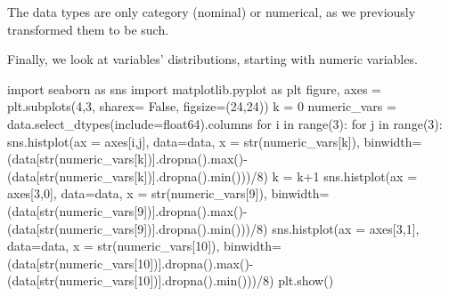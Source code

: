 \documentclass[
  11pt,
  letterpaper,
  DIV=11,
  numbers=noendperiod]{scrartcl}
\newenvironment{Shaded}{\begin{snugshade}}{\end{snugshade}}
\newcommand{\BuiltInTok}[1]{\textcolor[rgb]{0.00,0.23,0.31}{#1}}
\newcommand{\ControlFlowTok}[1]{\textcolor[rgb]{0.00,0.23,0.31}{#1}}
\newcommand{\DecValTok}[1]{\textcolor[rgb]{0.68,0.00,0.00}{#1}}
\newcommand{\ImportTok}[1]{\textcolor[rgb]{0.00,0.46,0.62}{#1}}
\newcommand{\KeywordTok}[1]{\textcolor[rgb]{0.00,0.23,0.31}{#1}}
\newcommand{\NormalTok}[1]{\textcolor[rgb]{0.00,0.23,0.31}{#1}}
\newcommand{\OperatorTok}[1]{\textcolor[rgb]{0.37,0.37,0.37}{#1}}
\newcommand{\StringTok}[1]{\textcolor[rgb]{0.13,0.47,0.30}{#1}}
\newcommand{\VariableTok}[1]{\textcolor[rgb]{0.07,0.07,0.07}{#1}}
\begin{document}
The data types are only category (nominal) or numerical, as we
previously transformed them to be such.

Finally, we look at variables' distributions, starting with numeric
variables.

\begin{Shaded}
\begin{Highlighting}[]
\ImportTok{import}\NormalTok{ seaborn }\ImportTok{as}\NormalTok{ sns}
\ImportTok{import}\NormalTok{ matplotlib.pyplot }\ImportTok{as}\NormalTok{ plt}
\NormalTok{figure, axes }\OperatorTok{=}\NormalTok{ plt.subplots(}\DecValTok{4}\NormalTok{,}\DecValTok{3}\NormalTok{, sharex}\OperatorTok{=} \VariableTok{False}\NormalTok{, figsize}\OperatorTok{=}\NormalTok{(}\DecValTok{24}\NormalTok{,}\DecValTok{24}\NormalTok{))}
\NormalTok{k }\OperatorTok{=} \DecValTok{0}
\NormalTok{numeric\_vars }\OperatorTok{=}\NormalTok{  data.select\_dtypes(include}\OperatorTok{=}\StringTok{\textquotesingle{}float64\textquotesingle{}}\NormalTok{).columns}
\ControlFlowTok{for}\NormalTok{ i }\KeywordTok{in} \BuiltInTok{range}\NormalTok{(}\DecValTok{3}\NormalTok{):}
    \ControlFlowTok{for}\NormalTok{ j }\KeywordTok{in} \BuiltInTok{range}\NormalTok{(}\DecValTok{3}\NormalTok{):}
\NormalTok{        sns.histplot(ax }\OperatorTok{=}\NormalTok{ axes[i,j], data}\OperatorTok{=}\NormalTok{data, x }\OperatorTok{=} \BuiltInTok{str}\NormalTok{(numeric\_vars[k]), binwidth}\OperatorTok{=}\NormalTok{(data[}\BuiltInTok{str}\NormalTok{(numeric\_vars[k])].dropna().}\BuiltInTok{max}\NormalTok{()}\OperatorTok{{-}}\NormalTok{(data[}\BuiltInTok{str}\NormalTok{(numeric\_vars[k])].dropna().}\BuiltInTok{min}\NormalTok{()))}\OperatorTok{/}\DecValTok{8}\NormalTok{)}
\NormalTok{        k }\OperatorTok{=}\NormalTok{ k}\OperatorTok{+}\DecValTok{1}
\NormalTok{sns.histplot(ax }\OperatorTok{=}\NormalTok{ axes[}\DecValTok{3}\NormalTok{,}\DecValTok{0}\NormalTok{], data}\OperatorTok{=}\NormalTok{data, x }\OperatorTok{=} \BuiltInTok{str}\NormalTok{(numeric\_vars[}\DecValTok{9}\NormalTok{]), binwidth}\OperatorTok{=}\NormalTok{(data[}\BuiltInTok{str}\NormalTok{(numeric\_vars[}\DecValTok{9}\NormalTok{])].dropna().}\BuiltInTok{max}\NormalTok{()}\OperatorTok{{-}}\NormalTok{(data[}\BuiltInTok{str}\NormalTok{(numeric\_vars[}\DecValTok{9}\NormalTok{])].dropna().}\BuiltInTok{min}\NormalTok{()))}\OperatorTok{/}\DecValTok{8}\NormalTok{)}
\NormalTok{sns.histplot(ax }\OperatorTok{=}\NormalTok{ axes[}\DecValTok{3}\NormalTok{,}\DecValTok{1}\NormalTok{], data}\OperatorTok{=}\NormalTok{data, x }\OperatorTok{=} \BuiltInTok{str}\NormalTok{(numeric\_vars[}\DecValTok{10}\NormalTok{]), binwidth}\OperatorTok{=}\NormalTok{(data[}\BuiltInTok{str}\NormalTok{(numeric\_vars[}\DecValTok{10}\NormalTok{])].dropna().}\BuiltInTok{max}\NormalTok{()}\OperatorTok{{-}}\NormalTok{(data[}\BuiltInTok{str}\NormalTok{(numeric\_vars[}\DecValTok{10}\NormalTok{])].dropna().}\BuiltInTok{min}\NormalTok{()))}\OperatorTok{/}\DecValTok{8}\NormalTok{)}
\NormalTok{plt.show()}
\end{Highlighting}
\end{Shaded}
\end{document}
